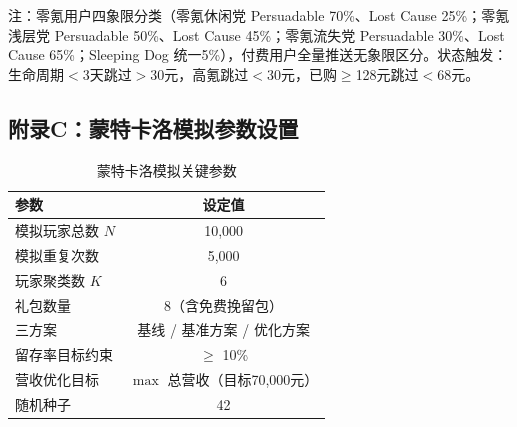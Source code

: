 \begin{table}[H]
\centering
\caption{优化方案策略完整表（8档礼包）}
\label{tab:full_strategy}
\end{table}

注：零氪用户四象限分类（零氪休闲党 Persuadable 70\%、Lost Cause 25\%；零氪浅层党 Persuadable 50\%、Lost Cause 45\%；零氪流失党 Persuadable 30\%、Lost Cause 65\%；Sleeping Dog 统一5\%），付费用户全量推送无象限区分。状态触发：生命周期$<$3天跳过$>$30元，高氪跳过$<$30元，已购$\geq$128元跳过$<$68元。

\subsection{附录C：蒙特卡洛模拟参数设置}

\begin{table}[H]
\centering
\caption{蒙特卡洛模拟关键参数}
\label{tab:mc_params}
\begin{tabular}{l|c}
\toprule
\textbf{参数} & \textbf{设定值} \\
\midrule
模拟玩家总数 $N$ & 10,000 \\
模拟重复次数 & 5,000 \\
玩家聚类数 $K$ & 6 \\
礼包数量 & 8（含免费挽留包） \\
三方案 & 基线 / 基准方案 / 优化方案 \\
留存率目标约束 & $\geq$ 10\% \\
营收优化目标 & $\max$ 总营收（目标70,000元） \\
随机种子 & 42 \\
\bottomrule
\end{tabular}
\end{table}



